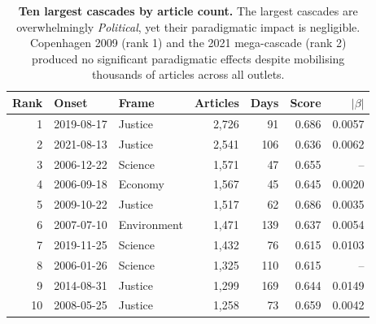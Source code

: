 \begin{table}[h]
\centering
\renewcommand{\arraystretch}{1.15}
\caption{\textbf{Ten largest cascades by article count.}
The largest cascades are overwhelmingly \emph{Political},
yet their paradigmatic impact is negligible.
Copenhagen 2009 (rank 1) and the 2021 mega-cascade (rank 2)
produced no significant paradigmatic effects despite
mobilising thousands of articles across all outlets.}
\label{tab:si_largest_cascades}
\vspace{0.3em}
\small
\begin{tabular}{@{}r l l r r r r@{}}
\toprule
Rank & Onset & Frame & Articles & Days & Score & $|\beta|$ \\
\midrule
1 & 2019-08-17 & Justice & 2,726 & 91 & 0.686 & 0.0057 \\
2 & 2021-08-13 & Justice & 2,541 & 106 & 0.636 & 0.0062 \\
3 & 2006-12-22 & Science & 1,571 & 47 & 0.655 & -- \\
4 & 2006-09-18 & Economy & 1,567 & 45 & 0.645 & 0.0020 \\
5 & 2009-10-22 & Justice & 1,517 & 62 & 0.686 & 0.0035 \\
6 & 2007-07-10 & Environment & 1,471 & 139 & 0.637 & 0.0054 \\
7 & 2019-11-25 & Science & 1,432 & 76 & 0.615 & 0.0103 \\
8 & 2006-01-26 & Science & 1,325 & 110 & 0.615 & -- \\
9 & 2014-08-31 & Justice & 1,299 & 169 & 0.644 & 0.0149 \\
10 & 2008-05-25 & Justice & 1,258 & 73 & 0.659 & 0.0042 \\
\bottomrule
\end{tabular}
\end{table}